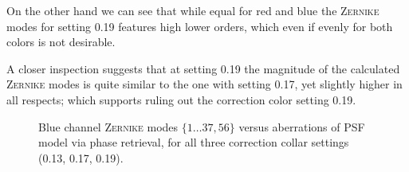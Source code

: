 \documentclass[11pt, a4paper, oneside, twocolumn]{report}
\begin{document}
On the other hand we can see that while equal for red and blue the
\textsc{Zernike} modes for setting 0.19 features high lower orders,
which even if evenly for both colors is not desirable.

A closer inspection suggests that at setting 0.19 the magnitude of the
calculated \textsc{Zernike} modes is quite similar to the one with
setting 0.17, yet slightly higher in all respects; which supports
ruling out the correction color setting 0.19.



\begin{figure}[!t]
  \caption{ Blue channel \textsc{Zernike} modes $\{1\dots37,56\}$ versus
    aberrations of PSF model via phase retrieval, for all three
    correction collar settings (0.13, 0.17, 0.19).}
  \label{f:zernblue}
\end{figure}
\end{document}
